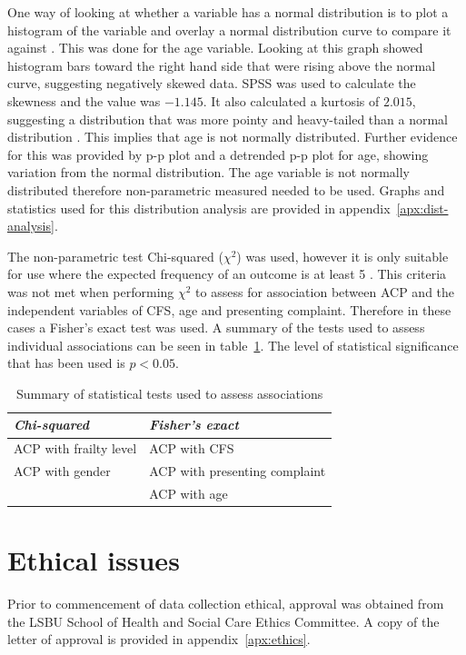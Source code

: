 \documentclass
[
	12pt,
	a4paper,
	oneside,
]{report}
\begin{document}
One way of looking at whether a variable has a normal distribution is to plot
a histogram of the variable and overlay a normal distribution curve to 
compare it against \parencite{field:09}. This was done for the age variable. 
Looking at this graph showed histogram bars toward the right hand side that 
were rising above the normal curve, suggesting negatively skewed data. SPSS
was used to calculate the skewness and the value was $-1.145$. It also 
calculated a kurtosis of $2.015$, suggesting a distribution that was more
pointy and heavy-tailed than a normal distribution \parencite{field:09}.
This implies that age is not normally distributed. Further evidence for this
was provided by p-p plot and a detrended p-p plot for age, showing 
variation from the normal distribution. The age variable is not normally 
distributed therefore non-parametric measured needed to be used. Graphs
and statistics used for this distribution analysis are provided in 
appendix~\ref{apx:dist-analysis}.

The non-parametric test Chi-squared ($\chi^2$) was used, 
however it is only
suitable for use where the expected frequency of an outcome is at least 5
\parencite[page 690]{field:09}. This criteria was not met when performing 
$\chi^2$ to assess for association between ACP and the independent variables 
of CFS, age and presenting complaint. Therefore in these cases a Fisher's exact
test was used. A summary of the tests used to assess individual associations
can be seen in table~\ref{tab:stat-tests}. 
The level of statistical significance that has been used is
$p<0.05$.

\begin{table}[ht]
\centering
\caption{Summary of statistical tests used to assess associations}
\label{tab:stat-tests}
\begin{tabular}{ l l }
\emph{Chi-squared} & \emph{Fisher's exact} \\
\hline
ACP with frailty level & ACP with CFS \\
ACP with gender & ACP with presenting complaint \\
 & ACP with age
\end{tabular}
\end{table}

\section{Ethical issues}

Prior to commencement of data collection ethical, approval was obtained from
the LSBU School of Health and Social Care Ethics Committee. A copy of the
letter of approval is provided in appendix~\ref{apx:ethics}.
\end{document}
